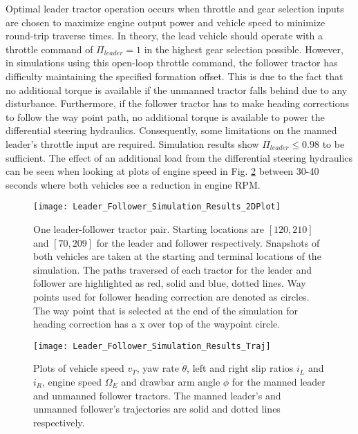 Optimal leader tractor operation occurs when throttle and gear selection inputs are chosen to maximize engine output power and vehicle speed to minimize round-trip traverse times. In theory, the lead vehicle should operate with a throttle command of $\Pi_{leader} = 1$ in the highest gear selection possible. However, in simulations using this open-loop throttle command, the follower tractor has difficulty maintaining the specified formation offset. This is due to the fact that no additional torque is available if the unmanned tractor falls behind due to any disturbance. Furthermore, if the follower tractor has to make heading corrections to follow the way point path, no additional torque is available to power the differential steering hydraulics. Consequently, some limitations on the manned leader's throttle input are required. Simulation results show $\Pi_{leader} \leq 0.98$ to be sufficient. The effect of an additional load from the differential steering hydraulics can be seen when looking at plots of engine speed in Fig. \ref{fig:Leader_Follower_Simulation_Results_Traj} between 30-40 seconds where both vehicles see a reduction in engine RPM.
\begin{figure}[hb]
    \centering
    \texttt{[image: Leader\_Follower\_Simulation\_Results\_2DPlot]}
    \caption{One leader-follower tractor pair. Starting locations are $[120, 210]$ and $[70, 209]$ for the leader and follower respectively. Snapshots of both vehicles are taken at the starting and terminal locations of the simulation. The paths traversed of each tractor for the leader and follower are highlighted as red, solid and blue, dotted lines. Way points used for follower heading correction are denoted as circles. The way point that is selected at the end of the simulation for heading correction has a x over top of the waypoint circle.}
    \label{fig:Leader_Follower_Simulation_Results_2DPlot}
\end{figure}
\begin{figure}[ht]
    \centering
    \texttt{[image: Leader\_Follower\_Simulation\_Results\_Traj]}
    \caption{Plots of vehicle speed $v_T$, yaw rate $\dot\theta$, left and right slip ratios $i_L$ and $i_R$, engine speed $\Omega_E$ and drawbar arm angle $\phi$ for the manned leader and unmanned follower tractors. The manned leader's and unmanned follower's trajectories are solid and dotted lines respectively.}
    \label{fig:Leader_Follower_Simulation_Results_Traj}
\end{figure}
